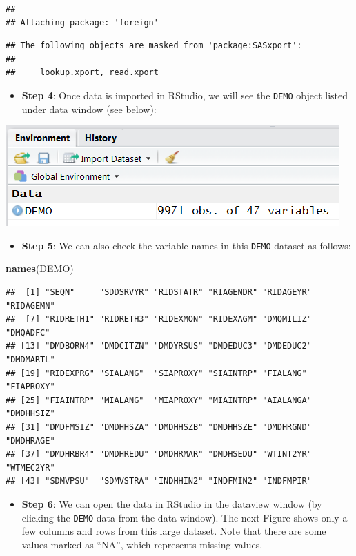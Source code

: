 \documentclass[
]{book}
\newenvironment{Shaded}{\begin{snugshade}}{\end{snugshade}}
\newcommand{\KeywordTok}[1]{\textcolor[rgb]{0.13,0.29,0.53}{\textbf{#1}}}
\newcommand{\NormalTok}[1]{#1}
\providecommand{\tightlist}{%
  \setlength{\itemsep}{0pt}\setlength{\parskip}{0pt}}
\begin{document}
\begin{verbatim}
## 
## Attaching package: 'foreign'
\end{verbatim}

\begin{verbatim}
## The following objects are masked from 'package:SASxport':
## 
##     lookup.xport, read.xport
\end{verbatim}

\begin{itemize}
\tightlist
\item
  \textbf{Step 4}: Once data is imported in RStudio, we will see the \texttt{DEMO} object listed under data window (see below):
\end{itemize}

\includegraphics[width=0.65\linewidth]{images/rdata}

\begin{itemize}
\tightlist
\item
  \textbf{Step 5}: We can also check the variable names in this \texttt{DEMO} dataset as follows:
\end{itemize}

\begin{Shaded}
\begin{Highlighting}[]
\KeywordTok{names}\NormalTok{(DEMO)}
\end{Highlighting}
\end{Shaded}

\begin{verbatim}
##  [1] "SEQN"     "SDDSRVYR" "RIDSTATR" "RIAGENDR" "RIDAGEYR" "RIDAGEMN"
##  [7] "RIDRETH1" "RIDRETH3" "RIDEXMON" "RIDEXAGM" "DMQMILIZ" "DMQADFC" 
## [13] "DMDBORN4" "DMDCITZN" "DMDYRSUS" "DMDEDUC3" "DMDEDUC2" "DMDMARTL"
## [19] "RIDEXPRG" "SIALANG"  "SIAPROXY" "SIAINTRP" "FIALANG"  "FIAPROXY"
## [25] "FIAINTRP" "MIALANG"  "MIAPROXY" "MIAINTRP" "AIALANGA" "DMDHHSIZ"
## [31] "DMDFMSIZ" "DMDHHSZA" "DMDHHSZB" "DMDHHSZE" "DMDHRGND" "DMDHRAGE"
## [37] "DMDHRBR4" "DMDHREDU" "DMDHRMAR" "DMDHSEDU" "WTINT2YR" "WTMEC2YR"
## [43] "SDMVPSU"  "SDMVSTRA" "INDHHIN2" "INDFMIN2" "INDFMPIR"
\end{verbatim}

\begin{itemize}
\tightlist
\item
  \textbf{Step 6}: We can open the data in RStudio in the dataview window (by clicking the \texttt{DEMO} data from the data window). The next Figure shows only a few columns and rows from this large dataset. Note that there are some values marked as ``NA'', which represents missing values.
\end{itemize}
\end{document}
